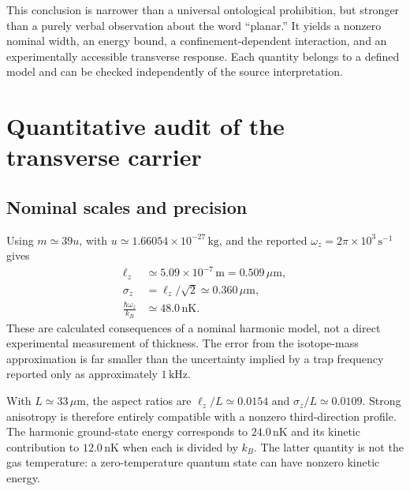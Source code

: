 \documentclass[11pt,a4paper]{article}
\theoremstyle{definition}
\theoremstyle{remark}
\newcommand{\lop}{\ell_z}
\begin{document}
This conclusion is narrower than a universal ontological prohibition, but stronger than a purely verbal observation about the word ``planar.'' It yields a nonzero nominal width, an energy bound, a confinement-dependent interaction, and an experimentally accessible transverse response. Each quantity belongs to a defined model and can be checked independently of the source interpretation.

\section{Quantitative audit of the transverse carrier}
\label{sec:numerics}
\subsection{Nominal scales and precision}
Using $m\simeq39u$, with $u\simeq1.66054\times10^{-27}\,\mathrm{kg}$, and the reported $\omega_z=2\pi\times10^3\,\mathrm{s}^{-1}$ gives
\begin{align}
 \lop&\simeq5.09\times10^{-7}\,\mathrm m
          =0.509\,\mu\mathrm m,\nonumber\\
 \sigma_z&=\lop/\sqrt2\simeq0.360\,\mu\mathrm m,\nonumber\\
 \frac{\hbar\omega_z}{k_B}&\simeq48.0\,\mathrm{nK}.
 \label{eq:numeric_width}
\end{align}
These are calculated consequences of a nominal harmonic model, not a direct experimental measurement of thickness. The error from the isotope-mass approximation is far smaller than the uncertainty implied by a trap frequency reported only as approximately $1\,\mathrm{kHz}$.\cite{zhang2026}

With $L\simeq33\,\mu\mathrm m$, the aspect ratios are $\lop/L\simeq0.0154$ and $\sigma_z/L\simeq0.0109$. Strong anisotropy is therefore entirely compatible with a nonzero third-direction profile. The harmonic ground-state energy corresponds to $24.0\,\mathrm{nK}$ and its kinetic contribution to $12.0\,\mathrm{nK}$ when each is divided by $k_B$. The latter quantity is not the gas temperature: a zero-temperature quantum state can have nonzero kinetic energy.\cite{zhang2026}
\end{document}
